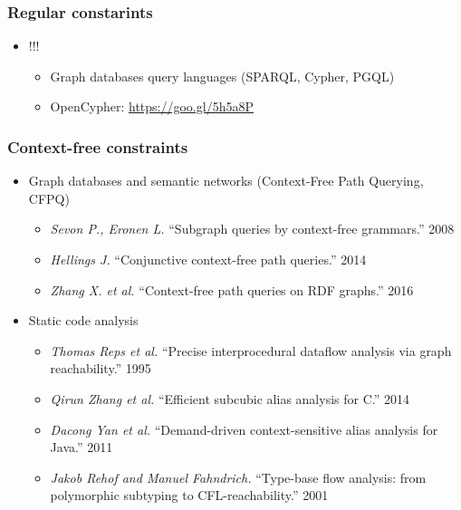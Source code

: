 \documentclass[xcolor=table,aspectratio=169]{beamer}
\begin{document}
\begin{frame}[fragile]
  \transwipe[direction=90]
  \frametitle{Regular constarints}
  \begin{itemize}
   \item !!!
    \begin{itemize}
      \item Graph databases query languages (SPARQL, Cypher, PGQL)
      \item OpenCypher: \url{https://goo.gl/5h5a8P}
    \end{itemize}  
  \end{itemize}
\end{frame}


\begin{frame}[fragile]
  \transwipe[direction=90]
  \frametitle{Context-free constraints}
  \begin{itemize}
  \item Graph databases and semantic networks (Context-Free Path Querying, CFPQ)
    \begin{itemize}
        \item \emph{Sevon P., Eronen L.} ``Subgraph queries by context-free grammars.'' 2008
        \item \emph{Hellings J.} ``Conjunctive context-free path queries.'' 2014
        \item \emph{Zhang X. et al.} ``Context-free path queries on RDF graphs.'' 2016
    \end{itemize}
    \item Static code analysis
    \begin{itemize}
        \item \emph{Thomas Reps et al.} ``Precise interprocedural dataflow analysis via graph reachability.'' 1995 
        \item \emph{Qirun Zhang et al.}  ``Efficient subcubic alias analysis for C.'' 2014
        \item \emph{Dacong Yan et al.} ``Demand-driven context-sensitive alias analysis for Java.'' 2011
        \item \emph{Jakob Rehof and Manuel Fahndrich.} ``Type-base flow analysis: from polymorphic subtyping to CFL-reachability.'' 2001
    \end{itemize}
  \end{itemize}
\end{frame}
\end{document}
